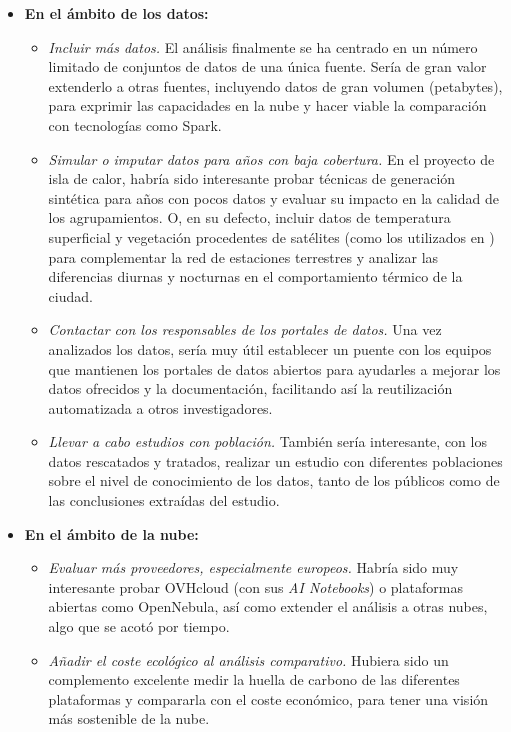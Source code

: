 \begin{itemize}
	\item \textbf{En el ámbito de los datos:}
	\begin{itemize}
		\item \emph{Incluir más datos.} El análisis finalmente se ha centrado en un número limitado de conjuntos de datos de una única fuente. Sería de gran valor extenderlo a otras fuentes, incluyendo datos de gran volumen (petabytes), para exprimir las capacidades en la nube y hacer viable la comparación con tecnologías como Spark.
		
		\item \emph{Simular o imputar datos para años con baja cobertura.} En el proyecto de isla de calor, habría sido interesante probar técnicas de generación sintética para años con pocos datos y evaluar su impacto en la calidad de los agrupamientos. O, en su defecto, incluir datos de temperatura superficial y vegetación procedentes de satélites (como los utilizados en \citep{urbanthermal2025}) para complementar la red de estaciones terrestres y analizar las diferencias diurnas y nocturnas en el comportamiento térmico de la ciudad.
		
		\item \emph{Contactar con los responsables de los portales de datos.} Una vez analizados los datos, sería muy útil establecer un puente con los equipos que mantienen los portales de datos abiertos para ayudarles a mejorar los datos ofrecidos y la documentación, facilitando así la reutilización automatizada a otros investigadores.
		
		\item \emph{Llevar a cabo estudios con población.} También sería interesante, con los datos rescatados y tratados, realizar un estudio con diferentes poblaciones sobre el nivel de conocimiento de los datos, tanto de los públicos como de las conclusiones extraídas del estudio.
	\end{itemize}
	
	\item \textbf{En el ámbito de la nube:}
	\begin{itemize}
		\item \emph{Evaluar más proveedores, especialmente europeos.} Habría sido muy interesante probar OVHcloud (con sus \textit{AI Notebooks}) o plataformas abiertas como OpenNebula, así como extender el análisis a otras nubes, algo que se acotó por tiempo.
		
		\item \emph{Añadir el coste ecológico al análisis comparativo.} Hubiera sido un complemento excelente medir la huella de carbono de las diferentes plataformas y compararla con el coste económico, para tener una visión más sostenible de la nube.
		

\end{itemize}
\end{itemize}
